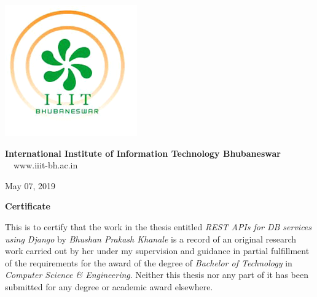 \thispagestyle{empty} 
\begin{minipage}{.1\linewidth}
\hspace*{-1.8cm}
\vspace*{-1.8cm}
\includegraphics[scale=0.65]{ch0/IIITlogo.png}
\end{minipage}
\hspace{.2cm}
\begin{minipage}{.9\linewidth}
{\Large
\textbf{International Institute of Information Technology Bhubaneswar\\}}
{\large
{}}
\textmd{$\quad$www.iiit-bh.ac.in}
\end{minipage}

\vspace{.35in}
%
\fontsize{12}{14}
\selectfont
\begin{flushright}
May 07, 2019
\end{flushright}
\vspace{1.0in}

\centerline{\Large{\bf Certificate}}
\vspace{1cm}
\noindent
This is to certify that the work in the thesis entitled
{\it REST APIs for DB services using Django } by {\it Bhushan Prakash Khanale}
is a record of an original research work carried out by her under my
supervision and guidance in partial fulfillment of the requirements for
the award of the degree of \textit{Bachelor of Technology} in
\textit{Computer Science \& Engineering}. Neither this thesis nor any part of
it has been submitted for any degree or academic award elsewhere.
\vspace*{0.5in}

